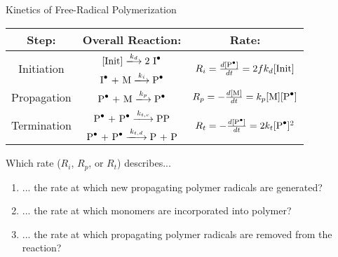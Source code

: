 \begin{activity}{Kinetics of Free-Radical Polymerization}
\begin{model}
	\begin{center}
		\renewcommand{\arraystretch}{2}
		\begin{tabular}{c c c}
			\textbf{Step:} & \textbf{Overall Reaction:} & \textbf{Rate:}\\\hline
			\multirow{2}{*}{Initiation} & $[\text{Init}] \xlongrightarrow{k_d} \text{2 \ce{I^.}}$ & \multirow{2}{*}{$ R_i = \frac{d\text{[\ce{P^.}]}}{dt} = 2fk_d[\text{Init}]$}\\
			 & $\text{\ce{I^.} + M} \xlongrightarrow{k_i} \text{\ce{P^.}}$ & \\\hline
			Propagation & $\text{\ce{P^.} + M} \xlongrightarrow{k_p} \text{\ce{P^.}}$ & $R_p = -\frac{d[\text{M}]}{dt} = k_p\text{[M][\ce{P^.}]}$\\\hline
			\multirow{2}{*}{Termination} & $\text{\ce{P^.} + \ce{P^.}} \xlongrightarrow{k_{t,c}} \text{\ce{PP}}$ & \multirow{2}{*}{$R_t = -\frac{d[\text{\ce{P^.}}]}{dt} = 2k_t [\text{\ce{P^.}}]^2$}\\
			& $\text{\ce{P^.} + \ce{P^.}} \xlongrightarrow{k_{t,d}} \text{P + P}$ & \\\hline
		\end{tabular}
	\end{center}
	\vspace{6pt}

\end{model}

\begin{ctqs}

	\question Which rate ($R_i$, $R_p$, or $R_t$) describes...
	
		\begin{enumerate}
			\item ... the rate at which new propagating polymer radicals are generated?
			
				\begin{solution}[0.5in]
				\end{solution}
				
			\item ... the rate at which monomers are incorporated into polymer?
			
				\begin{solution}[0.5in]
				\end{solution}
				
			\item ... the rate at which propagating polymer radicals are removed from the reaction?
			
				\begin{solution}[0.5in]
				\end{solution}
				

\end{enumerate}
\end{ctqs}
\end{activity}
